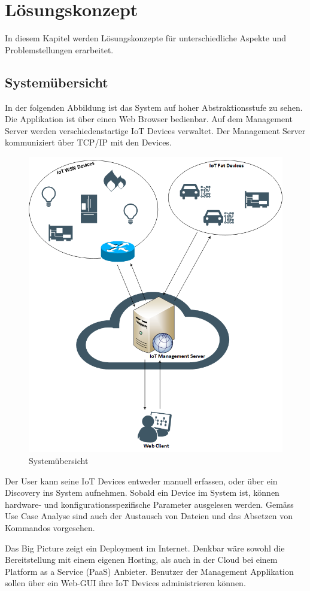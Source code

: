 \chapter{Lösungskonzept}
In diesem Kapitel werden Lösungskonzepte für unterschiedliche Aspekte und Problemstellungen erarbeitet. 

\section{Systemübersicht}
In der folgenden Abbildung ist das System auf hoher Abstraktionsstufe zu sehen. Die Applikation ist über einen Web Browser bedienbar. Auf dem Management Server werden verschiedenstartige IoT Devices verwaltet. Der Management Server kommuniziert über TCP/IP mit den Devices. 
\begin{figure}[H]
\centering
\includegraphics[scale=0.5]{images/systemuebersicht.png}
\caption{Systemübersicht}
\end{figure}
Der User kann seine IoT Devices entweder manuell erfassen, oder über ein Discovery ins System aufnehmen. Sobald ein Device im System ist, können hardware- und konfigurationsspezifische Parameter ausgelesen werden. Gemäss Use Case Analyse sind auch der Austausch von Dateien und das Absetzen von Kommandos vorgesehen.

Das Big Picture zeigt ein Deployment im Internet. Denkbar wäre sowohl die Bereitstellung mit einem eigenen Hosting, als auch in der Cloud bei einem Platform as a Service (PaaS) Anbieter. Benutzer der Management Applikation sollen über ein Web-GUI ihre IoT Devices administrieren können.

